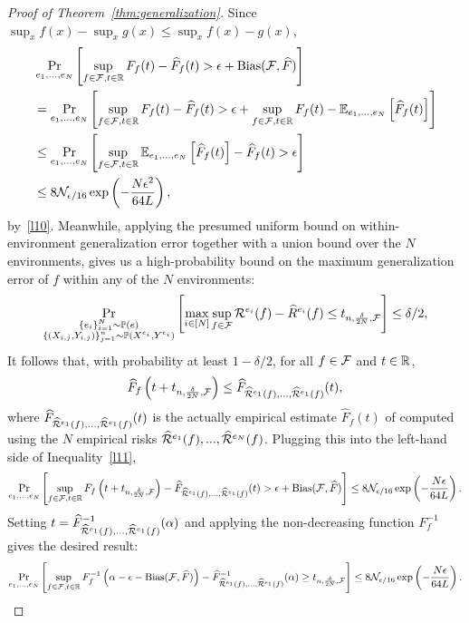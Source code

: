 \documentclass{article}
\begin{document}
\begin{proof}[Proof of Theorem~\ref{thm:generalization}]
    Since $\sup_x f(x) - \sup_x g(x) \leq \sup_x f(x) - g(x)$,
    \begin{align}
        \notag
        & \Pr_{e_1,...,e_N} \left[ \sup_{f \in \mathcal{F}, t \in \mathbb{R}} F_f(t) - \widehat F_f(t) > \epsilon + \operatorname{Bias}(\mathcal{F}, \widehat F) \right] \\
        \notag
        & = \Pr_{e_1,...,e_N} \left[ \sup_{f \in \mathcal{F}, t \in \mathbb{R}} F_f(t) - \widehat F_f(t) > \epsilon + \sup_{f \in \mathcal{F}, t \in \mathbb{R}} F_f(t) - \operatorname{\mathbb{E}}_{e_1,...,e_N} \left[ \widehat F_f(t) \right] \right] \\
        \notag
        & \leq \Pr_{e_1,...,e_N} \left[ \sup_{f \in \mathcal{F}, t \in \mathbb{R}} \operatorname{\mathbb{E}}_{e_1,...,e_N} \left[ \widehat F_f(t) \right] - \widehat F_f(t) > \epsilon \right] \\
        \label{l11}
        & \leq 8 \mathcal{N}_{\epsilon/16} \exp \left( - \frac{N\epsilon^2}{64L} \right),
    \end{align}
    by~\eqref{l10}.
    Meanwhile, applying the presumed uniform bound on within-environment generalization error together with a union bound over the $N$ environments, gives us a high-probability bound on the maximum generalization error of $f$ within any of the $N$ environments:
    \[\Pr_{\substack{\{e_i\}_{i = 1}^N \sim \mathbb{P}(e)\\\{(X_{i,j},Y_{i,j})\}_{j = 1}^n \sim \mathbb{P}(X^{e_i},Y^{e_i})}} \left[ \max_{i \in [N]} \sup_{f \in \mathcal{F}} \mathcal{R}^{e_i}(f) - \widehat{R}^{e_i}(f) \leq t_{n,\frac{\delta}{2N},\mathcal{F}} \right] \leq \delta/2,\]
    It follows that, with probability at least $1 - \delta/2$, for all $f \in \mathcal{F}$ and $t \in \mathbb{R}$,
    \[\widehat F_f \left( t + t_{n,\frac{\delta}{2N},\mathcal{F}} \right)
      \leq \widehat F_{\widehat {\mathcal{R}}^{e_1}(f),...,\widehat {\mathcal{R}}^{e_1}(f)}(t),\]
    where $\widehat F_{\widehat {\mathcal{R}}^{e_1}(f),...,\widehat {\mathcal{R}}^{e_1}(f)}(t)$ is the actually empirical estimate $\widehat F_f(t)$ of computed using the $N$ empirical risks $\widehat {\mathcal{R}}^{e_1}(f),...,\widehat {\mathcal{R}}^{e_N}(f)$.
    Plugging this into the left-hand side of Inequality~\eqref{l11},
    \[\Pr_{e_1,...,e_N} \left[ \sup_{f \in \mathcal{F}, t \in \mathbb{R}} F_f \left( t + t_{n,\frac{\delta}{2N},\mathcal{F}} \right) - \widehat F_{\widehat {\mathcal{R}}^{e_1}(f),...,\widehat {\mathcal{R}}^{e_1}(f)}(t) > \epsilon  + \operatorname{Bias}(\mathcal{F}, \widehat F) \right]
    \leq 8 \mathcal{N}_{\epsilon/16} \exp \left( - \frac{N\epsilon}{64L} \right).\]
    Setting $t = \widehat F^{-1}_{\widehat {\mathcal{R}}^{e_1}(f),...,\widehat {\mathcal{R}}^{e_1}(f)}(\alpha)$ and applying the non-decreasing function $F_f^{-1}$ gives the desired result:
    \[\Pr_{e_1,...,e_N} \left[ \sup_{f \in \mathcal{F}, t \in \mathbb{R}} F_f^{-1} \left( \alpha - \epsilon - \operatorname{Bias}(\mathcal{F}, \widehat F) \right) - \widehat F^{-1}_{\widehat {\mathcal{R}}^{e_1}(f),...,\widehat {\mathcal{R}}^{e_1}(f)}(\alpha) \geq t_{n,\frac{\delta}{2N},\mathcal{F}} \right]
    \leq 8 \mathcal{N}_{\epsilon/16} \exp \left( - \frac{N\epsilon}{64L} \right).\]
\end{proof}
\end{document}
